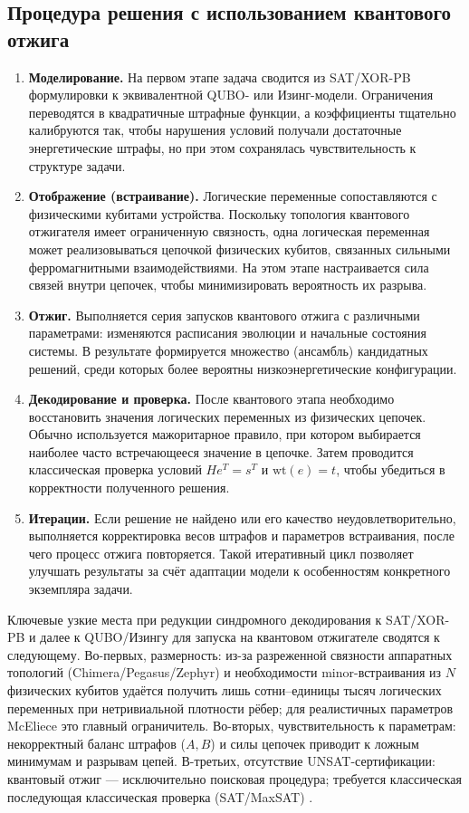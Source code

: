 \subsection*{Процедура решения с использованием квантового отжига}
\begin{enumerate}
  \item \textbf{Моделирование.} На первом этапе задача сводится из SAT/XOR-PB формулировки к эквивалентной QUBO- или Изинг-модели. Ограничения переводятся в квадратичные штрафные функции, а коэффициенты тщательно калибруются так, чтобы нарушения условий получали достаточные энергетические штрафы, но при этом сохранялась чувствительность к структуре задачи.
  
  \item \textbf{Отображение (встраивание).} Логические переменные сопоставляются с физическими кубитами устройства. Поскольку топология квантового отжигателя имеет ограниченную связность, одна логическая переменная может реализовываться цепочкой физических кубитов, связанных сильными ферромагнитными взаимодействиями. На этом этапе настраивается сила связей внутри цепочек, чтобы минимизировать вероятность их разрыва.
  
  \item \textbf{Отжиг.} Выполняется серия запусков квантового отжига с различными параметрами: изменяются расписания эволюции и начальные состояния системы. В результате формируется множество (ансамбль) кандидатных решений, среди которых более вероятны низкоэнергетические конфигурации.
  
  \item \textbf{Декодирование и проверка.} После квантового этапа необходимо восстановить значения логических переменных из физических цепочек. Обычно используется мажоритарное правило, при котором выбирается наиболее часто встречающееся значение в цепочке. Затем проводится классическая проверка условий $He^T = s^T$ и $\mathrm{wt}(e) = t$, чтобы убедиться в корректности полученного решения.
  
  \item \textbf{Итерации.} Если решение не найдено или его качество неудовлетворительно, выполняется корректировка весов штрафов и параметров встраивания, после чего процесс отжига повторяется. Такой итеративный цикл позволяет улучшать результаты за счёт адаптации модели к особенностям конкретного экземпляра задачи.
\end{enumerate}


Ключевые узкие места при редукции синдромного декодирования к SAT/XOR-PB и далее к QUBO/Изингу для запуска на квантовом отжигателе сводятся к следующему. Во-первых, размерность: из-за разреженной связности аппаратных топологий (Chimera/Pegasus/Zephyr) и необходимости minor-встраивания из $N$ физических кубитов удаётся получить лишь сотни–единицы тысяч логических переменных при нетривиальной плотности рёбер; для реалистичных параметров McEliece это главный ограничитель. Во-вторых, чувствительность к параметрам: некорректный баланс штрафов ($A,B$) и силы цепочек приводит к ложным минимумам и разрывам цепей. В-третьих, отсутствие UNSAT-сертификации: квантовый отжиг — исключительно поисковая процедура; требуется классическая последующая классическая проверка (SAT/MaxSAT) \cite{Bian2018,Sirdey2023}.

